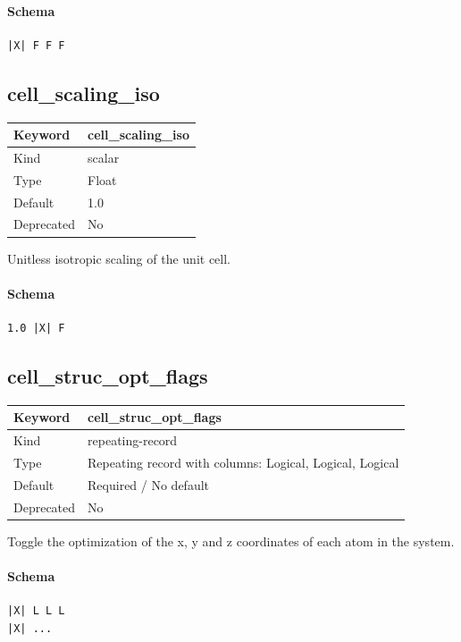 \documentclass[11pt]{article}
\begin{document}
\paragraph{Schema}
\begin{Verbatim}
|X| F F F
\end{Verbatim}

\subsection{cell\_scaling\_iso}
\label{kw:cell-scaling-iso}
\begin{longtable}{|p{1.5in}|p{4.5in}|}
\hline
Keyword & cell\_scaling\_iso \\
\hline
Kind & scalar \\
\hline
Type & Float \\
\hline
Default & 1.0 \\
\hline
Deprecated & No \\
\hline
\end{longtable}
 Unitless isotropic scaling of the unit cell.

\paragraph{Schema}
\begin{Verbatim}
1.0 |X| F
\end{Verbatim}

\subsection{cell\_struc\_opt\_flags}
\label{kw:cell-struc-opt-flags}
\begin{longtable}{|p{1.5in}|p{4.5in}|}
\hline
Keyword & cell\_struc\_opt\_flags \\
\hline
Kind & repeating-record \\
\hline
Type & Repeating record with columns: Logical, Logical, Logical \\
\hline
Default & Required / No default \\
\hline
Deprecated & No \\
\hline
\end{longtable}
 Toggle the optimization of the x, y and z coordinates of each atom in the
 system.

\paragraph{Schema}
\begin{Verbatim}
|X| L L L
|X| ...
\end{Verbatim}
\end{document}

